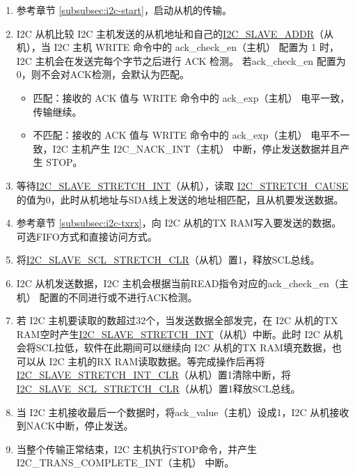 \documentclass[main\_\_CN.tex]{subfiles}
\begin{document}
\begin{enumerate}
\item 参考章节 \ref{subsubsec:i2c-start}，启动从机的传输。
\item I2C 从机比较 I2C 主机发送的从机地址和自己的\hyperref[fielddesc:I2CSLAVEADDR]{I2C\_SLAVE\_ADDR}（从机），当 I2C 主机 WRITE 命令中的 ack\_check\_en（主机） 配置为 1 时，I2C 主机会在发送完每个字节之后进行 ACK 检测。 若ack\_check\_en 配置为 0，则不会对ACK检测，会默认为匹配。
\begin{itemize}
\item 匹配：接收的 ACK 值与 WRITE 命令中的 ack\_exp（主机） 电平一致，传输继续。
\item 不匹配：接收的 ACK 值与 WRITE 命令中的 ack\_exp（主机） 电平不一致，I2C 主机产生 I2C\_NACK\_INT（主机） 中断，停止发送数据并且产生 STOP。
\end{itemize}

\item 等待\hyperref[int:i2c-slave-stretch]{I2C\_SLAVE\_STRETCH\_INT}（从机），读取 \hyperref[fielddesc:I2CSTRETCHCAUSE]{I2C\_STRETCH\_CAUSE} 的值为0，此时从机地址与SDA线上发送的地址相匹配，且从机要发送数据。
\item 参考章节 \ref{subsubsec:i2c-txrx}，向 I2C 从机的TX RAM写入要发送的数据。可选FIFO方式和直接访问方式。
\item 将\hyperref[fielddesc:I2CSLAVESCLSTRETCHCLR]{I2C\_SLAVE\_SCL\_STRETCH\_CLR}（从机）置1，释放SCL总线。

\item I2C 从机发送数据，I2C 主机会根据当前READ指令对应的ack\_check\_en（主机） 配置的不同进行或不进行ACK检测。
\item 若 I2C 主机要读取的数超过32个，当发送数据全部发完，在 I2C 从机的TX RAM空时产生\hyperref[int:i2c-slave-stretch]{I2C\_SLAVE\_STRETCH\_INT}（从机）中断。此时 I2C 从机会将SCL拉低，软件在此期间可以继续向 I2C 从机的TX RAM填充数据，也可以从 I2C 主机的RX RAM读取数据。等完成操作后再将\hyperref[fielddesc:I2CSLAVESTRETCHINTCLR]{I2C\_SLAVE\_STRETCH\_INT\_CLR}（从机）置1清除中断，将 \hyperref[fielddesc:I2CSLAVESCLSTRETCHCLR]{I2C\_SLAVE\_SCL\_STRETCH\_CLR}（从机）置1释放SCL总线。

\item 当 I2C 主机接收最后一个数据时，将ack\_value（主机）设成1，I2C 从机接收到NACK中断，停止发送。

\item 当整个传输正常结束，I2C 主机执行STOP命令，并产生 I2C\_TRANS\_COMPLETE\_INT（主机） 中断。

\end{enumerate}
\end{document}
